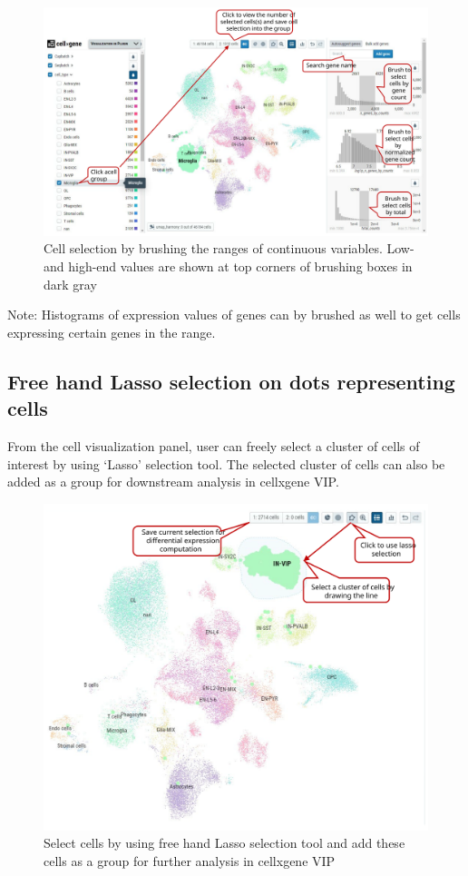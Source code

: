 \documentclass[
]{article}
\begin{document}
\begin{figure}
\centering
\includegraphics{figures/F3_label.svg}
\caption{Cell selection by brushing the ranges of continuous variables. Low- and high-end values are shown at top corners of brushing boxes in dark gray}
\end{figure}

Note: Histograms of expression values of genes can by brushed as well to get cells expressing certain genes in the range.

\hypertarget{free-hand-lasso-selection-on-dots-representing-cells}{%
\subsection{Free hand Lasso selection on dots representing cells}\label{free-hand-lasso-selection-on-dots-representing-cells}}

From the cell visualization panel, user can freely select a cluster of cells of interest by using `Lasso' selection tool. The selected cluster of cells can also be added as a group for downstream analysis in cellxgene VIP.

\begin{figure}
\centering
\includegraphics{figures/F4_label.svg}
\caption{Select cells by using free hand Lasso selection tool and add these cells as a group for further analysis in cellxgene VIP}
\end{figure}
\end{document}
